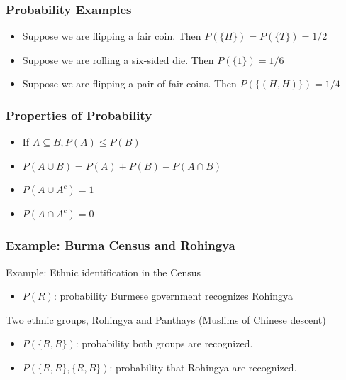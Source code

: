 \documentclass[handout]{beamer}
\numberwithin{equation}{section}
\begin{document}
\begin{frame}
\frametitle{Probability Examples}

\pause 

\begin{itemize}
\item[-] Suppose we are flipping a \alert{fair} coin.  Then $P(\{H\}) = P(\{T\}) = 1/2 $\pause 
\item[-] Suppose we are rolling a six-sided die.  Then $P(\{1\}) = 1/6$ \pause 
\item[-] Suppose we are flipping a pair of fair coins.  Then $P(\{(H, H)\}) = 1/4$
\end{itemize}

\end{frame}

\begin{frame}
\frametitle{Properties of Probability}

\pause 

\begin{itemize}
\item[-] If $A\subseteq B, P(A)\leq P(B) $\pause 
\item[-] $P(A\cup B)= P(A)+P(B)-P(A\cap B)$  \pause 
\item[-] $P(A\cup A^{c}) = 1$ 
\item[-] $P(A\cap A^{c}) = 0$ 


\end{itemize}

\end{frame}



\begin{frame}
\frametitle{Example: Burma Census and Rohingya} 

Example: Ethnic identification in the Census\pause 
\begin{itemize}
\item[-] $P(R)$: probability Burmese government recognizes Rohingya \pause 
\end{itemize}

Two ethnic groups, Rohingya and Panthays (Muslims of Chinese descent)  \pause 
\begin{itemize}
\item[-] $P(\{R,R\})$: probability both groups are recognized.\pause 
\item[-] $P( \{R,R\}, \{R, B\} ) $: probability that Rohingya are recognized. \pause 
\end{itemize}

\end{frame}
\end{document}

